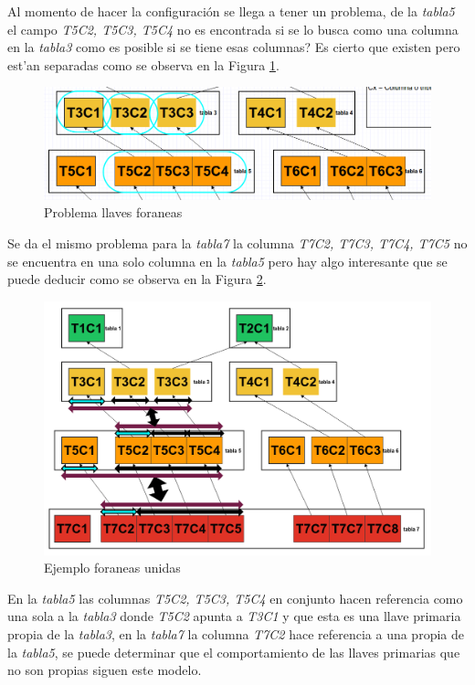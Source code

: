 Al momento de hacer la configuraci\'on se llega a tener un problema, de la \textit{tabla5} el campo  \textit{T5C2, T5C3, T5C4} no es encontrada si se lo busca como una columna en la \textit{tabla3} como es posible si se tiene esas columnas? Es cierto que existen pero est'an separadas como se observa en la Figura \ref{fig:problemaColumnasForaneasLine}.
\begin{figure}[H]
\centering
\includegraphics[scale=0.4]{images/problemaColumnas.png}
\caption{Problema llaves foraneas}\label{fig:problemaColumnasForaneasLine}
\end{figure}
Se da el mismo problema para la \textit{tabla7} la columna \textit{T7C2, T7C3, T7C4, T7C5} no se encuentra en una solo columna en la \textit{tabla5} pero hay algo interesante que se puede deducir como se observa en la Figura \ref{fig:problemaColumnasForaneasGrafica}.
\begin{figure}[H]
\centering
\includegraphics[scale=0.3]{images/problemaForaneas.png}
\caption{Ejemplo foraneas unidas}\label{fig:problemaColumnasForaneasGrafica}
\end{figure}
En la \textit{tabla5} las columnas \textit{T5C2, T5C3, T5C4} en conjunto hacen referencia como una sola a la \textit{tabla3} donde \textit{T5C2} apunta a \textit{T3C1} y que esta es una llave primaria propia de la \textit{tabla3}, en la \textit{tabla7} la columna  \textit{T7C2} hace referencia a una propia de la \textit{tabla5}, se puede determinar que el comportamiento de las llaves primarias que no son propias siguen este modelo.
